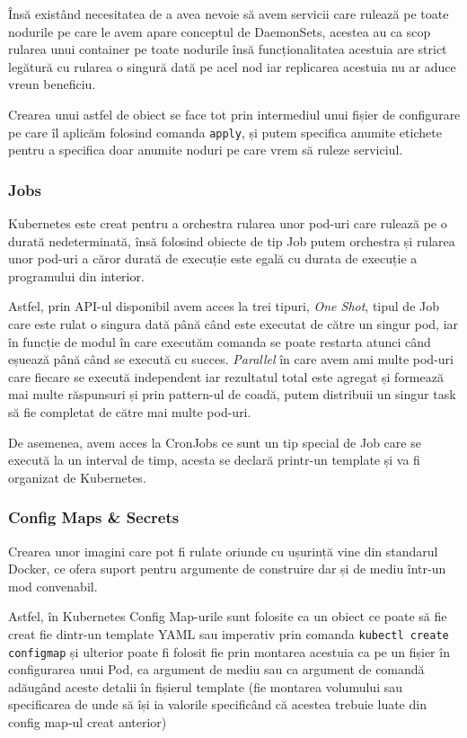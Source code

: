 Însă existând necesitatea de a avea nevoie să avem servicii care rulează pe toate
nodurile pe care le avem apare conceptul de DaemonSets, acestea au ca scop rularea unui container
pe toate nodurile însă funcționalitatea acestuia are strict legătură cu rularea o singură dată pe acel nod
iar replicarea acestuia nu ar aduce vreun beneficiu.

Crearea unui astfel de obiect se face tot prin intermediul unui fișier de configurare 
pe care îl aplicăm folosind comanda \verb|apply|, și putem specifica anumite etichete 
pentru a specifica doar anumite noduri pe care vrem să ruleze serviciul.

\subsubsection{Jobs}

Kubernetes este creat pentru a orchestra rularea unor pod-uri care rulează 
pe o durată nedeterminată, însă folosind obiecte de tip Job putem orchestra și 
rularea unor pod-uri a căror durată de execuție este egală cu durata de execuție
a programului din interior.

Astfel, prin API-ul disponibil avem acces la trei tipuri, \emph{One Shot}, tipul de Job 
care este rulat o singura dată până când este executat de către un singur pod, 
iar în funcție de modul în care executăm comanda se poate restarta atunci când eșuează 
până când se execută cu succes. \emph{Parallel} în care avem ami multe pod-uri care
fiecare se execută independent iar rezultatul total este agregat și formează mai multe răspunsuri 
și prin pattern-ul de coadă, putem distribuii un singur task să fie completat
de către mai multe pod-uri.

De asemenea, avem acces la CronJobs ce sunt un tip special de Job care se execută
la un interval de timp, acesta se declară printr-un template și va fi organizat
de Kubernetes.

\subsubsection{Config Maps \& Secrets}

Crearea unor imagini care pot fi rulate oriunde cu ușurință vine din standarul Docker,
ce ofera suport pentru argumente de construire dar și de mediu într-un mod convenabil.

Astfel, în Kubernetes Config Map-urile sunt folosite ca un obiect ce poate să fie creat
fie dintr-un template YAML sau imperativ prin comanda \verb|kubectl create configmap|
și ulterior poate fi folosit fie prin montarea acestuia ca pe un fișier în configurarea
unui Pod, ca argument de mediu sau ca argument de comandă adăugând aceste detalii
în fișierul template (fie montarea volumului sau specificarea de unde să își ia valorile
specificând că acestea trebuie luate din config map-ul creat anterior)

